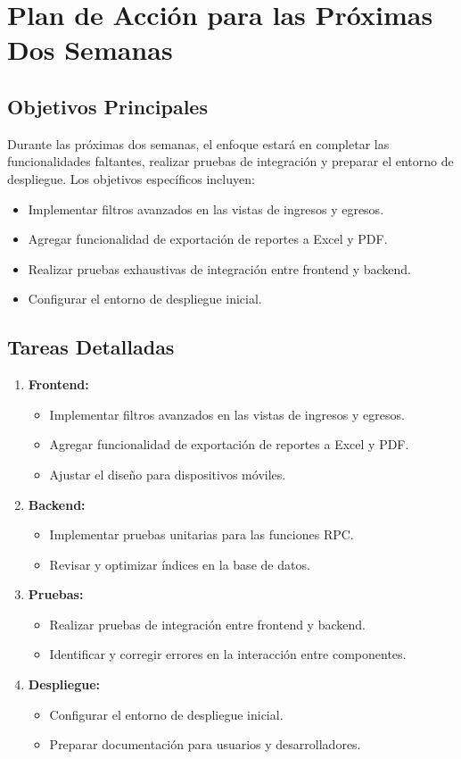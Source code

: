 \section{Plan de Acción para las Próximas Dos Semanas}

\subsection{Objetivos Principales}
Durante las próximas dos semanas, el enfoque estará en completar las funcionalidades faltantes, realizar pruebas de integración y preparar el entorno de despliegue. Los objetivos específicos incluyen:
\begin{itemize}
    \item Implementar filtros avanzados en las vistas de ingresos y egresos.
    \item Agregar funcionalidad de exportación de reportes a Excel y PDF.
    \item Realizar pruebas exhaustivas de integración entre frontend y backend.
    \item Configurar el entorno de despliegue inicial.
\end{itemize}

\subsection{Tareas Detalladas}
\begin{enumerate}
    \item \textbf{Frontend:}
    \begin{itemize}
        \item Implementar filtros avanzados en las vistas de ingresos y egresos.
        \item Agregar funcionalidad de exportación de reportes a Excel y PDF.
        \item Ajustar el diseño para dispositivos móviles.
    \end{itemize}
    \item \textbf{Backend:}
    \begin{itemize}
        \item Implementar pruebas unitarias para las funciones RPC.
        \item Revisar y optimizar índices en la base de datos.
    \end{itemize}
    \item \textbf{Pruebas:}
    \begin{itemize}
        \item Realizar pruebas de integración entre frontend y backend.
        \item Identificar y corregir errores en la interacción entre componentes.
    \end{itemize}
    \item \textbf{Despliegue:}
    \begin{itemize}
        \item Configurar el entorno de despliegue inicial.
        \item Preparar documentación para usuarios y desarrolladores.
    \end{itemize}
\end{enumerate}

